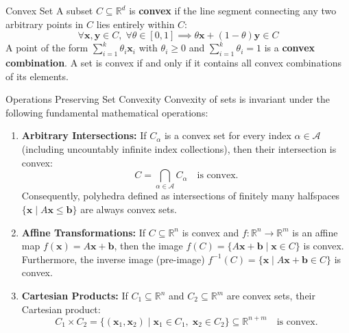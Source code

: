 \begin{definitionbox}{Convex Set}
A subset $C \subseteq \mathbb{R}^d$ is \textbf{convex} if the line segment connecting any two arbitrary points in $C$ lies entirely within $C$:
\begin{equation}
\forall \mathbf{x}, \mathbf{y} \in C, \; \forall \theta \in [0, 1] \implies \theta \mathbf{x} + (1 - \theta)\mathbf{y} \in C
\label{eq:convex_set_def}
\end{equation}
A point of the form $\sum_{i=1}^k \theta_i \mathbf{x}_i$ with $\theta_i \ge 0$ and $\sum_{i=1}^k \theta_i = 1$ is a \textbf{convex combination}. A set is convex if and only if it contains all convex combinations of its elements.
\end{definitionbox}

\begin{theorembox}{Operations Preserving Set Convexity}
Convexity of sets is invariant under the following fundamental mathematical operations:
\begin{enumerate}
    \item \textbf{Arbitrary Intersections:} If $C_\alpha$ is a convex set for every index $\alpha \in \mathcal{A}$ (including uncountably infinite index collections), then their intersection is convex:
    \begin{equation}
    C = \bigcap_{\alpha \in \mathcal{A}} C_\alpha \quad \text{is convex.}
    \end{equation}
    Consequently, polyhedra defined as intersections of finitely many halfspaces $\{\mathbf{x} \mid A\mathbf{x} \le \mathbf{b}\}$ are always convex sets.
    \item \textbf{Affine Transformations:} If $C \subseteq \mathbb{R}^n$ is convex and $f: \mathbb{R}^n \to \mathbb{R}^m$ is an affine map $f(\mathbf{x}) = A\mathbf{x} + \mathbf{b}$, then the image $f(C) = \{A\mathbf{x} + \mathbf{b} \mid \mathbf{x} \in C\}$ is convex. Furthermore, the inverse image (pre-image) $f^{-1}(C) = \{\mathbf{x} \mid A\mathbf{x} + \mathbf{b} \in C\}$ is convex.
    \item \textbf{Cartesian Products:} If $C_1 \subseteq \mathbb{R}^n$ and $C_2 \subseteq \mathbb{R}^m$ are convex sets, their Cartesian product:
    \begin{equation}
    C_1 \times C_2 = \{(\mathbf{x}_1, \mathbf{x}_2) \mid \mathbf{x}_1 \in C_1, \; \mathbf{x}_2 \in C_2\} \subseteq \mathbb{R}^{n+m} \quad \text{is convex.}
    \end{equation}
\end{enumerate}
\end{theorembox}

